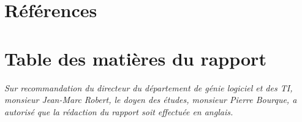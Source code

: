 \documentclass[a4paper, oneside, 12pt, titlepage]{article}
\begin{document}
\section{Références}


\renewcommand*{\refname}{\vspace*{-1em}}\vspace*{-1em}

\nocite{*}



\section{Table des matières du rapport}

\emph{Sur recommandation du directeur du département de génie logiciel et des TI, monsieur Jean-Marc
Robert, le doyen des études, monsieur Pierre Bourque, a autorisé que la rédaction du rapport soit
effectuée en anglais.}
\end{document}
